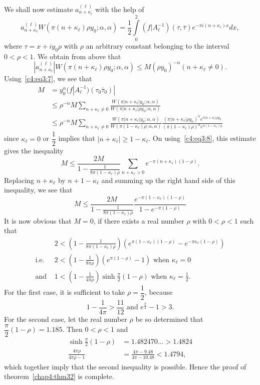 We shall now estimate $a^{(\ell)}_{n+\kappa_{\ell}}$ with the help of 
$$
a^{(\ell)}_{n+\kappa_{\ell}} W(\pi(n+\kappa_{\ell})\rho y_0; \alpha,
\alpha) =\frac{1}{2} \int\limits^2_0
(f|A^{-1}_{\ell})(\tau,\bar{\tau}) e^{-\pi i(n+\kappa_{\ell})x}dx,
$$
where $\tau=x+iy_0\rho$ with $\rho$ an arbitrary constant belonging to
the interval $0<\rho<1$. We obtain from above that
$$
|a^{(\ell)}_{n+\kappa_{\ell}}| W(\pi(n+\kappa_{\ell})\rho
y_0;\alpha,\alpha)  \leq M(\rho y_0)^{-\alpha} (n+\kappa_{\ell} \neq
0). 
$$
Using~\eqref{c4:eq3:7}, we see that
\begin{align*}
M & = y^{\alpha}_0(f|A^{-1}_{\ell}) (\tau_0\bar{\tau}_0)|\\
& \leq \rho^{-\alpha}M\sum_{n+\kappa_{\ell}\neq 0}
\frac{W(\pi|n+\kappa_{\ell}|y_0;\alpha,
  \alpha)}{W(\pi|n+\kappa_{\ell}|\rho y_0;\alpha,\alpha)}\\
& \leq \rho^{-\alpha} M \sum_{n+\kappa_{\ell} \neq 0}
\frac{W(\pi|n+\kappa_{\ell}|y_0;\alpha,\alpha)}{W(\pi(1-\kappa_{\ell})
  \rho;\alpha,\alpha)} \frac{(\pi|n+\kappa_{\ell}|\rho y_0)^{\alpha}
  e^{\pi|n+\kappa_{\ell}|\rho
    y_0}}{(\pi(1-\kappa_{\ell})\rho)^{\alpha}e^{\pi(1-\kappa_{\ell})\rho}}   
\end{align*}
since \pageoriginale $\kappa_{\ell}=0$ or $\dfrac{1}{2}$ implies that
$|n+\kappa_{\ell}|\geq 1-\kappa_{\ell}$. On using~\eqref{c4:eq3:8}, this estimate
gives the inequality
$$
M\leq \frac{2M}{1-\frac{1}{8\pi(1-\kappa_{\ell})\rho}}
\sum_{n+\kappa_{\ell}>0} e^{-\pi(n+\kappa_{\ell})(1-\rho)}.
$$
Replacing $n+\kappa_{\ell}$ by $n+1-\kappa_{\ell}$ and summing up the
right hand side of this inequality, we see that
\begin{equation*}
M\leq \frac{2M}{1-\frac{1}{8\pi(1-\kappa_{\ell})\rho}}
\frac{e^{-\pi(1-\kappa_{\ell})(1-\rho)}}
{1-e^{-\pi(1-\rho)}}  \tag{9}\label{c4:eq3:9}
\end{equation*}
It is now obvious that $M=0$, if there exists a real number $\rho$
with $0<\rho<1$ such that
\begin{align*}
& 2<(1-\frac{1}{8\pi(1-\kappa_{\ell})\rho})
(e^{\pi(1-\kappa_{\ell})(1-\rho)} -e^{-\pi\kappa_{\ell}(1-\rho)}) \\
\text{i.e. }  & 2 < (1-\frac{1}{8\pi \rho})
(e^{\pi(1-\rho)}-1) \text{ when } \kappa_{\ell}=0 \\
\text{and } & 1 < (1-\frac{1}{4\pi\rho}) \sinh
\frac{\pi}{2}(1-\rho) \text{ when } \kappa_{\ell} =\frac{1}{2}. 
\end{align*}
For the first case, it is sufficient to take $\rho=\dfrac{1}{2}$,
because
$$
1-\frac{1}{4\pi} >\frac{11}{12} \text{ and } e^{\frac{\pi}{2}}-1>3.
$$
For the second case, let the real number $\rho$ be so determined that
$\dfrac{\pi}{2}(1-\rho)=1.185$. Then $0<\rho<1$ and
\begin{align*}
\sinh \frac{\pi}{2}(1-\rho) & = 1.482470\ldots > 1.4824\\
\frac{4\pi \rho}{4\pi \rho-1} & = \frac{4\pi-9.48}{4\pi-10.48} < 1.4794,
\end{align*}
which together imply that the second inequality is possible. Hence the
proof of theorem~\ref{chap4:thm32} is complete.

